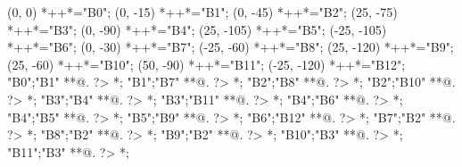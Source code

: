 \begin{scriptsize}
\xy(0, 0)
	*++{}*\frm{-,}="B0";
(0, -15)
	*++{}*\frm{-,}="B1";
(0, -45)
	*++{}*\frm{-,}="B2";
(25, -75)
	*++{}*\frm{-,}="B3";
(0, -90)
	*++{}*\frm{-,}="B4";
(25, -105)
	*++{}*\frm{-,}="B5";
(-25, -105)
	*++{}*\frm{-,}="B6";
(0, -30)
	*++{}*\frm{-,}="B7";
(-25, -60)
	*++{}*\frm{-,}="B8";
(25, -120)
	*++{}*\frm{-,}="B9";
(25, -60)
	*++{}*\frm{-,}="B10";
(50, -90)
	*++{}*\frm{-,}="B11";
(-25, -120)
	*++{}*\frm{-,}="B12";
"B0";"B1" **@{.} ?> *{\dir{>}};
"B1";"B7" **@{.} ?> *{\dir{>}};
"B2";"B8" **@{.} ?> *{\dir{>}};
"B2";"B10" **@{.} ?> *{\dir{>}};
"B3";"B4" **@{.} ?> *{\dir{>}};
"B3";"B11" **@{.} ?> *{\dir{>}};
"B4";"B6" **@{.} ?> *{\dir{>}};
"B4";"B5" **@{.} ?> *{\dir{>}};
"B5";"B9" **@{.} ?> *{\dir{>}};
"B6";"B12" **@{.} ?> *{\dir{>}};
"B7";"B2" **@{.} ?> *{\dir{>}};
"B8";"B2" **@{.} ?> *{\dir{>}};
"B9";"B2" **@{.} ?> *{\dir{>}};
"B10";"B3" **@{.} ?> *{\dir{>}};
"B11";"B3" **@{.} ?> *{\dir{>}};
\endxy
\end{scriptsize}


